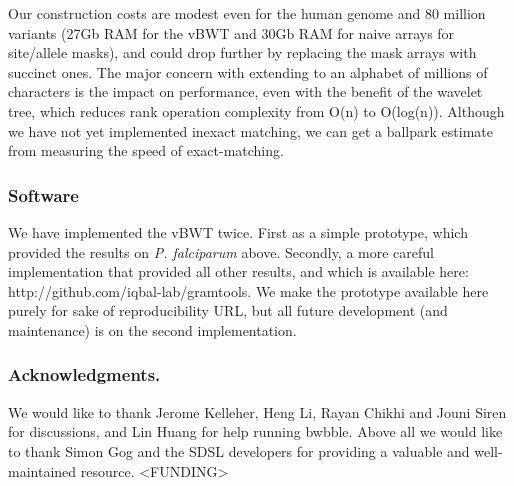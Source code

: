 \documentclass[runningheads,a4paper]{llncs}
\begin{document}
Our construction costs are modest even for the human genome and 80 million variants (27Gb RAM for the vBWT and 30Gb RAM for naive arrays for site/allele masks), and could drop further by replacing the mask  arrays with succinct ones. The major concern with extending to an alphabet of millions of characters is the impact on performance,  even with the benefit of the wavelet tree, which reduces rank operation complexity from O(n) to O(log(n)). Although we have not yet implemented inexact matching, we can get a ballpark estimate from measuring the speed of exact-matching.






\subsubsection{Software}
We have implemented the vBWT twice. First as a simple prototype, which provided the results on \textit{P. falciparum} above. Secondly,  a more careful implementation that provided all other results, and which is available here: http://github.com/iqbal-lab/gramtools. We make the prototype available here purely for sake of reproducibility URL, but all future development (and maintenance) is on the second implementation.



\subsubsection*{Acknowledgments.} We would like to thank Jerome Kelleher, Heng Li, Rayan Chikhi and Jouni Siren for discussions, and Lin Huang for help running bwbble. Above all we would like to thank Simon Gog and the SDSL developers for providing a valuable and well-maintained resource. <FUNDING>
\end{document}
